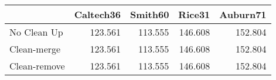 \begin{tabular}{lrrrr}
\toprule
{} & Caltech36 & Smith60 &  Rice31 & Auburn71 \\
\midrule
No Clean Up  &   123.561 & 113.555 & 146.608 &  152.804 \\
Clean-merge  &   123.561 & 113.555 & 146.608 &  152.804 \\
Clean-remove &   123.561 & 113.555 & 146.608 &  152.804 \\
\bottomrule
\end{tabular}
